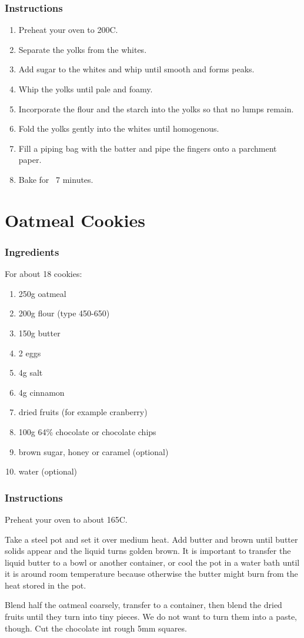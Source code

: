 \documentclass[11pt]{report}
\newcommand{\header}[1]{\subsubsection*{#1}}
\begin{document}
\header{Instructions}
\begin{enumerate}
  \item Preheat your oven to 200C.
  \item Separate the yolks from the whites.
  \item Add sugar to the whites and whip until smooth and forms peaks.
  \item Whip the yolks until pale and foamy.
  \item Incorporate the flour and the starch into the yolks so that no lumps
    remain.
  \item Fold the yolks gently into the whites until homogenous.
  \item Fill a piping bag with the batter and pipe the fingers onto a parchment
    paper.
  \item Bake for ~7 minutes.
\end{enumerate}

\section{Oatmeal Cookies}
\header{Ingredients}
For about 18 cookies:
\begin{enumerate}
  \item 250g oatmeal
  \item 200g flour (type 450-650)
  \item 150g butter
  \item 2 eggs
  \item 4g salt
  \item 4g cinnamon
  \item dried fruits (for example cranberry)
  \item 100g 64\% chocolate or chocolate chips
  \item brown sugar, honey or caramel (optional)
  \item water (optional)
\end{enumerate}

\header{Instructions}
Preheat your oven to about 165C.

Take a steel pot and set it over medium heat. Add butter and brown until butter
solids appear and the liquid turns golden brown. It is important to transfer
the liquid butter to a bowl or another container, or cool the pot in a water
bath until it is around room temperature because otherwise the butter might
burn from the heat stored in the pot.

Blend half the oatmeal coarsely, transfer to a container, then blend the dried
fruits until they turn into tiny pieces. We do not want to turn them into a
paste, though. Cut the chocolate int rough 5mm squares.
\end{document}
